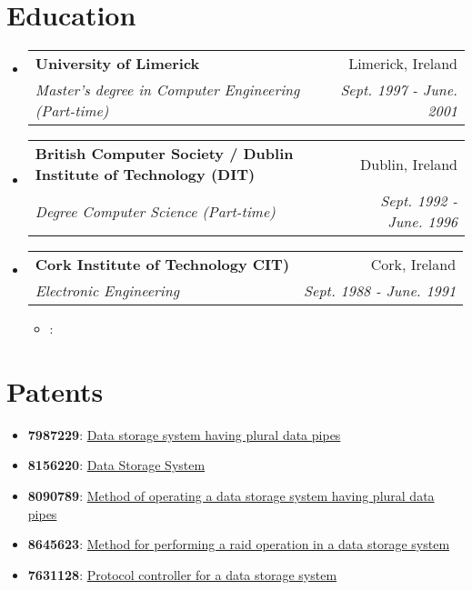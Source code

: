 \documentclass[letterpaper,10pt]{article}
\makeatletter
\def \ifempty#1{\def\temp{#1} \ifx\temp\empty }
\newcommand{\resumeItem}[2]{
  \item\small{
  	\ifempty{#1}#2\else\textbf{#1}{: #2 \vspace{-2pt}}\fi
  }
}
\newcommand{\resumeSubheading}[4]{
  \vspace{-1pt}\item
    \begin{tabular*}{0.97\textwidth}{l@{\extracolsep{\fill}}r}
      \textbf{#1} & \textcolor{mygray}{#2} \\
      \textit{\small#3} & \textcolor{mygray}{\textit{\small #4}} \\
    \end{tabular*}\vspace{-5pt}
}
\newcommand{\resumeSubHeadingListStart}{\begin{itemize}[leftmargin=*]}
\newcommand{\resumeSubHeadingListEnd}{\end{itemize}}
\newcommand{\resumeItemListStart}{\begin{itemize}[leftmargin=0.2in]}
\newcommand{\resumeItemListEnd}{\end{itemize}\vspace{-5pt}}
\makeatother
\begin{document}
\section{Education}
  \resumeSubHeadingListStart
    \resumeSubheading
       {University of Limerick}{Limerick, Ireland}
      {Master's degree in Computer Engineering (Part-time)}{Sept. 1997 - June. 2001}
  \resumeSubheading
       {British Computer Society / Dublin Institute of Technology (DIT)}{Dublin, Ireland}{Degree Computer Science (Part-time)}{Sept. 1992 - June. 1996}
    \resumeSubheading
      {Cork Institute of Technology CIT)}{Cork, Ireland}
      {Electronic Engineering}{Sept. 1988 - June. 1991}
	 \resumeItemListStart
        \resumeItem{}
          {}
      \resumeItemListEnd
  \resumeSubHeadingListEnd

%
\section{Patents}
 \resumeSubHeadingListStart
   \item{
     \textbf{7987229}{: \href{https://patents.google.com/patent/US7987229B1/en?oq=7987229}{Data storage system having plural data pipes}}
   }\vspace{-7pt}
   \item{
     \textbf{8156220}{: \href{https://patents.google.com/patent/US8156220B1/en?oq=8156220} {Data Storage System}}
   }\vspace{-7pt}
   \item{
     \textbf{8090789}{: \href{https://patents.google.com/patent/US8090789B1/en?oq=8090789} {Method of operating a data storage system having plural data pipes}}
   }\vspace{-7pt}
   \item{
     \textbf{8645623}{: \href{https://patents.google.com/patent/US8645623B1/en?oq=8645623} {Method for performing a raid operation in a data storage system}}
   }
   \vspace{-7pt}
   \item{
     \textbf{7631128}{: \href{https://patents.google.com/patent/US7631128B1/en?oq=7631128} {Protocol controller for a data storage system}}
   }
 \resumeSubHeadingListEnd


\end{document}
